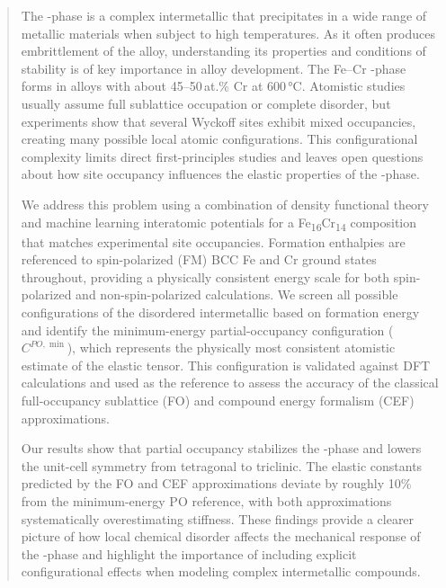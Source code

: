 \documentclass[superscriptaddress, 12pt]{revtex4-2}%
\begin{document}
\begin{abstract}
The \textsigma-phase is a complex intermetallic that precipitates in a wide range of metallic materials when subject to high temperatures.
As it often produces embrittlement of the alloy, understanding its properties and conditions of stability is of key importance in alloy development. 
The Fe–Cr \textsigma-phase forms in alloys with about 45–50\,at.\% Cr at 600\,°C. 
Atomistic studies usually assume full sublattice occupation or complete disorder, but experiments show that several Wyckoff sites exhibit mixed occupancies, creating many possible local atomic configurations.
This configurational complexity limits direct first-principles studies and leaves open questions about how site occupancy influences the elastic properties of the \textsigma-phase.

We address this problem using a combination of density functional theory and machine learning interatomic potentials for a Fe\textsubscript{16}Cr\textsubscript{14} composition that matches experimental site occupancies.
Formation enthalpies are referenced to spin-polarized (FM) BCC Fe and Cr ground states throughout, providing a physically consistent energy scale for both spin-polarized and non-spin-polarized calculations.
We screen all possible configurations of the disordered intermetallic based on formation energy and identify the minimum-energy partial-occupancy configuration ($C^{PO,\min}$), which represents the physically most consistent atomistic estimate of the elastic tensor.
This configuration is validated against DFT calculations and used as the reference to assess the accuracy of the classical full-occupancy sublattice (FO) and compound energy formalism (CEF) approximations.

Our results show that partial occupancy stabilizes the \textsigma-phase and lowers the unit-cell symmetry from tetragonal to triclinic.
The elastic constants predicted by the FO and CEF approximations deviate by roughly 10\% from the minimum-energy PO reference, with both approximations systematically overestimating stiffness.
These findings provide a clearer picture of how local chemical disorder affects the mechanical response of the \textsigma-phase and highlight the importance of including explicit configurational effects when modeling complex intermetallic compounds.

\end{abstract}

\maketitle
\end{document}
